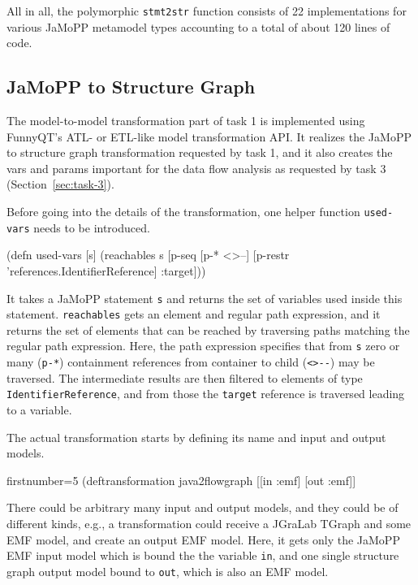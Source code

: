 \documentclass[11pt]{article}
\begin{document}
All in all, the polymorphic \verb|stmt2str| function consists of 22
implementations for various JaMoPP metamodel types accounting to a total of
about 120 lines of code.


\subsection{JaMoPP to Structure Graph}
\label{sec:jamopp-struct-graph}

The model-to-model transformation part of task 1 is implemented using FunnyQT's
ATL- or ETL-like model transformation API.  It realizes the JaMoPP to structure
graph transformation requested by task 1, and it also creates the vars and
params important for the data flow analysis as requested by task 3
(Section~\ref{sec:task-3}).

Before going into the details of the transformation, one helper function
\verb|used-vars| needs to be introduced.

\begin{clojurecode}
(defn used-vars [s]
  (reachables s [p-seq [p-* <>--]
                 [p-restr 'references.IdentifierReference]
                 :target]))
\end{clojurecode}

It takes a JaMoPP statement \verb|s| and returns the set of variables used
inside this statement.  \verb|reachables| gets an element and regular path
expression, and it returns the set of elements that can be reached by
traversing paths matching the regular path expression.  Here, the path
expression specifies that from \verb|s| zero or many (\verb|p-*|) containment
references from container to child (\verb|<>--|) may be traversed.  The
intermediate results are then filtered to elements of type
\verb|IdentifierReference|, and from those the \verb|target| reference is
traversed leading to a variable.

The actual transformation starts by defining its name and input and output
models.

\begin{clojurecode*}{firstnumber=5}
(deftransformation java2flowgraph [[in :emf] [out :emf]]
\end{clojurecode*}

There could be arbitrary many input and output models, and they could be of
different kinds, e.g., a transformation could receive a JGraLab TGraph and some
EMF model, and create an output EMF model.  Here, it gets only the JaMoPP EMF
input model which is bound the the variable \verb|in|, and one single structure
graph output model bound to \verb|out|, which is also an EMF model.
\end{document}
